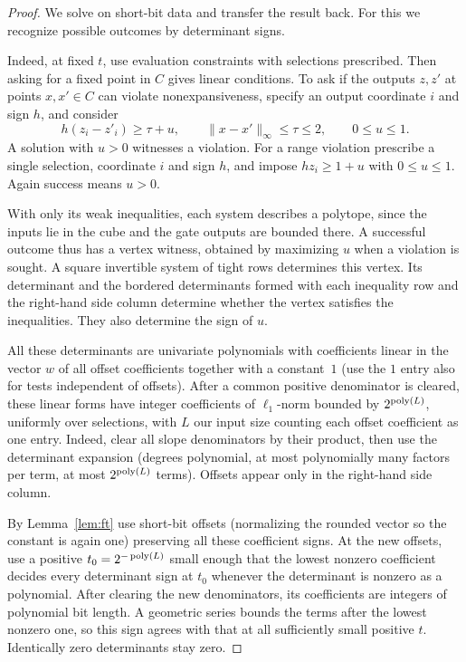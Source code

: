 \begin{proof}
We solve on short-bit data and transfer the result back.
For this we recognize possible outcomes by determinant signs.

Indeed, at fixed \(t\), use evaluation constraints with
selections prescribed. Then asking for a fixed point in \(C\)
gives linear conditions. To ask if the outputs \(z,z'\)
at points \(x,x'\in C\) can violate nonexpansiveness,
specify an output coordinate \(i\) and sign \(h\), and consider
\[
  h(z_i-z'_i)\ge \tau+u,\qquad
  \|x-x'\|_\infty\le\tau\le2,\qquad 0\le u\le1 .
\]
A solution with \(u>0\) witnesses a violation. For a range violation
prescribe a single selection, coordinate \(i\) and sign \(h\), and
impose \(hz_i\ge1+u\) with \(0\le u\le1\). Again success means
\(u>0\).

With only its weak inequalities, each system describes a polytope,
since the inputs lie in the cube and the gate outputs are bounded
there. A successful outcome thus has a vertex witness, obtained by
maximizing \(u\) when a violation is sought. A square invertible
system of tight rows determines this vertex. Its determinant and
the bordered determinants formed with each inequality row and the
right-hand side column determine whether the vertex satisfies
the inequalities. They also determine the sign of \(u\).

All these determinants are univariate polynomials with
coefficients linear in the vector \(w\)
of all offset coefficients together with a constant~\(1\)
(use the \(1\) entry also for tests independent of offsets).
After a common positive denominator is cleared, these linear
forms have integer coefficients of \(\ell_1\)-norm bounded
by \(2^{\operatorname{poly}(L)}\), uniformly over selections,
with \(L\) our input size counting each offset coefficient as one entry.
Indeed, clear all slope denominators by their product,
then use the determinant expansion
(degrees polynomial, at most polynomially many factors per term,
at most \(2^{\operatorname{poly}(L)}\) terms).
Offsets appear only in the right-hand side column.

By Lemma~\ref{lem:ft} use short-bit offsets (normalizing
the rounded vector so the constant is again one)
preserving all these coefficient signs.
At the new offsets, use a positive
\(t_0=2^{-\operatorname{poly}(L)}\)
small enough that the lowest nonzero coefficient
decides every determinant sign at \(t_0\)
whenever the determinant is nonzero as a polynomial.
After clearing the new denominators, its coefficients are integers
of polynomial bit length. A geometric series bounds the terms
after the lowest nonzero one, so this sign agrees with that at all
sufficiently small positive \(t\). Identically zero determinants
stay zero.


\end{proof}
